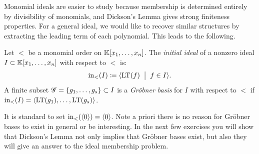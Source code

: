 \documentclass[12pt,reqno]{amsart}
\begin{document}
\hrulefill

Monomial ideals are easier to study because membership is determined entirely by divisibility of monomials, and Dickson’s Lemma gives strong finiteness properties. For a general ideal, we would like to recover similar structures by extracting the leading term of each polynomial. This leads to the following.

\begin{definition}
Let $<$ be a monomial order on $\mathbb{K}[x_1,\ldots,x_n]$.  The \emph{initial ideal} of a nonzero ideal $I \subset \mathbb{K}[x_1,\ldots,x_n]$ with respect to $<$ is:
\[
\operatorname{in}_{<}(I) \coloneqq \langle \operatorname{LT}(f) \;\; \big| \;\; f \in I \rangle. 
\]
A finite subset $\mathcal{G} =\{g_1,\ldots,g_s\} \subset I$ is a \emph{Gr\"{o}bner basis} for $I$ with respect to $<$ if $\operatorname{in}_{<}(I) = \langle \operatorname{LT}(g_1), \ldots, \operatorname{LT}(g_s)\rangle$.
\end{definition}

It is standard to set $\operatorname{in}_{<}(\langle0\rangle)=\langle 0\rangle$. Note a priori there is no reason for Gr\"{o}bner bases to exist in general or be interesting. In the next few exercises you will show that Dickson's Lemma not only implies that Gr\"{o}bner bases exist, but also they will give an answer to the ideal membership problem. 

\hrulefill
\end{document}
